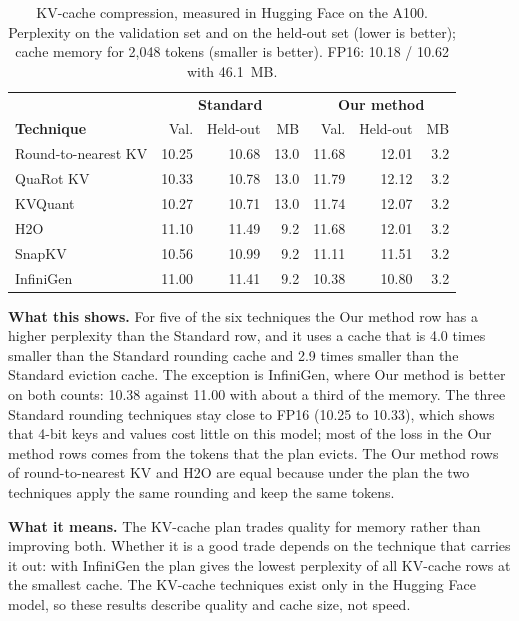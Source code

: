 \documentclass[
11pt, %
english, %
singlespacing, %
headsepline, %
]{MastersDoctoralThesis} %
\begin{document}
\begin{table}[htbp]
\centering
\small
\caption{KV-cache compression, measured in Hugging Face on the A100. Perplexity on the validation set and on the held-out set (lower is better); cache memory for 2{,}048 tokens (smaller is better). FP16: 10.18 / 10.62 with 46.1~MB.}
\label{tab:ch5-kv}
\renewcommand{\arraystretch}{1.15}
\begin{tabularx}{\textwidth}{Xrrrrrr}
\hline
 & \multicolumn{3}{c}{\textbf{Standard}} & \multicolumn{3}{c}{\textbf{Our method}} \\
\textbf{Technique} & Val. & Held-out & MB & Val. & Held-out & MB \\
\hline
Round-to-nearest KV & 10.25 & 10.68 & 13.0 & 11.68 & 12.01 & 3.2 \\
QuaRot KV & 10.33 & 10.78 & 13.0 & 11.79 & 12.12 & 3.2 \\
KVQuant & 10.27 & 10.71 & 13.0 & 11.74 & 12.07 & 3.2 \\
H2O & 11.10 & 11.49 & 9.2 & 11.68 & 12.01 & 3.2 \\
SnapKV & 10.56 & 10.99 & 9.2 & 11.11 & 11.51 & 3.2 \\
InfiniGen & 11.00 & 11.41 & 9.2 & 10.38 & 10.80 & 3.2 \\
\hline
\end{tabularx}
\end{table}

\textbf{What this shows.} For five of the six techniques the Our method row has a higher perplexity than the Standard row, and it uses a cache that is 4.0 times smaller than the Standard rounding cache and 2.9 times smaller than the Standard eviction cache. The exception is InfiniGen, where Our method is better on both counts: 10.38 against 11.00 with about a third of the memory. The three Standard rounding techniques stay close to FP16 (10.25 to 10.33), which shows that 4-bit keys and values cost little on this model; most of the loss in the Our method rows comes from the tokens that the plan evicts. The Our method rows of round-to-nearest KV and H2O are equal because under the plan the two techniques apply the same rounding and keep the same tokens.

\textbf{What it means.} The KV-cache plan trades quality for memory rather than improving both. Whether it is a good trade depends on the technique that carries it out: with InfiniGen the plan gives the lowest perplexity of all KV-cache rows at the smallest cache. The KV-cache techniques exist only in the Hugging Face model, so these results describe quality and cache size, not speed.
\end{document}
